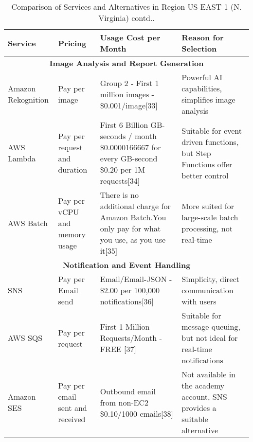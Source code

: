 \begin{table}[htbp]
    \centering
    \caption{Comparison of Services and Alternatives in Region US-EAST-1 (N. Virginia) contd..}
    \label{tab:comparison2}
    \begin{tabular}{|p{3cm}|p{3.5cm}|p{3.5cm}|p{6cm}|}
    \hline
        \textbf{Service} & \textbf{Pricing} & \textbf{Usage Cost per Month} & \textbf{Reason for Selection} \\
        \hline
        \multicolumn{4}{|c|}{\textbf{Image Analysis and Report Generation}} \\
        \hline
        Amazon Rekognition & Pay per image & 
        Group 2 - First 1 million images - \$0.001/image[33]
        
        & Powerful AI capabilities, simplifies image analysis \\
        \hline
        AWS Lambda & Pay per request and duration &
        First 6 Billion GB-seconds / month	\$0.0000166667 for every GB-second	\$0.20 per 1M requests[34]
        
        & Suitable for event-driven functions, but Step Functions offer better control \\
        \hline
        AWS Batch & Pay per vCPU and memory usage & 
        There is no additional charge for Amazon Batch.You only pay for what you use, as you use it[35]
        
        & More suited for large-scale batch processing, not real-time \\
        \hline
        \multicolumn{4}{|c|}{\textbf{Notification and Event Handling}} \\
        \hline
        SNS & Pay per Email send & Email/Email-JSON - \$2.00 per 100,000 notifications[36] & Simplicity, direct communication with users \\
        \hline
        AWS SQS & Pay per request & First 1 Million Requests/Month - FREE [37] & Suitable for message queuing, but not ideal for real-time notifications \\
        \hline
        Amazon SES & Pay per email sent and received & Outbound email from non-EC2	\$0.10/1000 emails[38] & Not available in the academy account, SNS provides a suitable alternative \\
        \hline
    \end{tabular}
\end{table}


